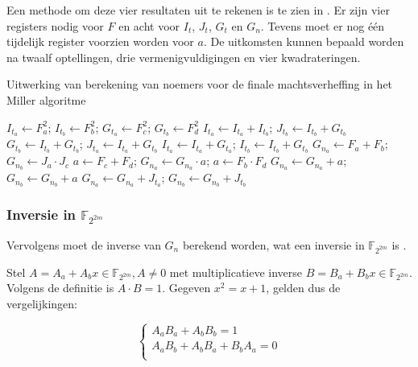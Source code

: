 Een methode om deze vier resultaten uit te rekenen is te zien in . Er zijn vier registers nodig voor $F$ en acht voor $I_t$, $J_t$, $G_t$ en $G_n$. Tevens moet er nog \'e\'en tijdelijk register voorzien worden voor $a$. De uitkomsten kunnen bepaald worden na twaalf optellingen, drie vermenigvuldigingen en vier kwadrateringen.

\begin{algorithm}[h]
	\caption{Uitwerking van berekening van noemers voor de finale machtsverheffing in het Miller algoritme}
	\label{algoritme-implementatie-miller-final-noemers}
	$I_{t_a} \gets F_a^2$; $I_{t_b} \gets F_b^2$; $G_{t_a} \gets F_c^2$; $G_{t_b} \gets F_d^2$\;
	$I_{t_a} \gets I_{t_a} + I_{t_b}$; $J_{t_b} \gets I_{t_b} + G_{t_b}$\;
	$G_{t_b} \gets I_{t_b} + G_{t_b}$; $J_{t_a} \gets I_{t_a} + G_{t_b}$\;
	$I_{t_a} \gets I_{t_a} + G_{t_a}$; $I_{t_b} \gets I_{t_b} + G_{t_b}$\;
	$G_{n_a} \gets F_a + F_b$; $G_{n_b} \gets J_a \cdot J_c$\;
	$a \gets F_c + F_d$; $G_{n_a} \gets G_{n_a} \cdot a$; $a \gets F_b \cdot F_d$\;
	$G_{n_a} \gets G_{n_a} + a$; $G_{n_b} \gets G_{n_b} + a$\;
	$G_{n_a} \gets G_{n_a} + J_{t_a}$; $G_{n_b} \gets G_{n_b} + J_{t_b}$\;
\end{algorithm}

\subsubsection{Inversie in $\mathbb{F}_{2^{2m}}$}

Vervolgens moet de inverse van $G_n$ berekend worden, wat een inversie in $\mathbb{F}_{2^{2m}}$ is \cite{beuchat}.

Stel $A = A_a + A_b x \in \mathbb{F}_{2^{2m}}, A \neq 0$ met multiplicatieve inverse $B = B_a + B_b x \in \mathbb{F}_{2^{2m}}$. Volgens de definitie is $A \cdot B = 1$. Gegeven $x^2 = x + 1$, gelden dus de vergelijkingen:

\[\left\{\begin{array}{l}
A_a B_a + A_b B_b = 1\\
A_a B_b + A_b B_a + B_b A_a = 0\\
\end{array}\right.\]

